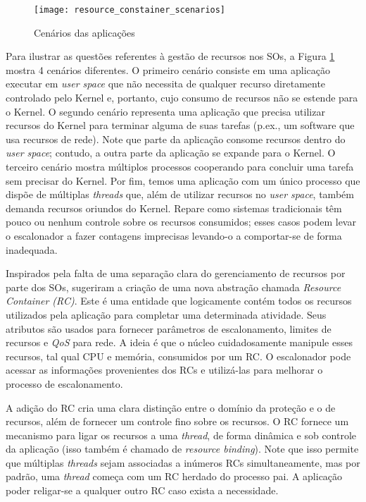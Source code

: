 \begin{figure}[!h]
  \centering
  \texttt{[image: resource\_constainer\_scenarios]} 
  \caption{Cenários das aplicações}
  \label{fig:resource_constainer_scenarios}
\end{figure}

Para ilustrar as questões referentes à gestão de recursos nos SOs, a Figura
\ref{fig:resource_constainer_scenarios} mostra 4 cenários diferentes. O
primeiro cenário consiste em uma aplicação executar em \textit{user space} que
não necessita de qualquer recurso diretamente controlado pelo Kernel e,
portanto, cujo consumo de recursos não se estende para o Kernel. O segundo
cenário representa uma aplicação que precisa utilizar recursos do Kernel para
terminar alguma de suas tarefas (p.ex., um software que usa recursos de rede).
Note que parte da aplicação consome recursos dentro do \textit{user space};
contudo, a outra parte da aplicação se expande para o Kernel. O terceiro cenário
mostra múltiplos processos cooperando para concluir uma tarefa sem precisar
do Kernel. Por fim, temos uma aplicação com um único processo que dispõe de
múltiplas \emph{threads} que, além de utilizar recursos no \textit{user space}, também
demanda recursos oriundos do Kernel. Repare como sistemas tradicionais têm
pouco ou nenhum controle sobre os recursos consumidos; esses casos
podem levar o escalonador a fazer contagens imprecisas levando-o a
comportar-se de forma inadequada.

Inspirados pela falta de uma separação clara do gerenciamento de recursos por
parte dos SOs, \citet{resourcecontainers} sugeriram a criação de uma nova
abstração chamada \emph{Resource Container (RC)}. Este é uma entidade que
logicamente contém todos os recursos utilizados pela aplicação para completar
uma determinada atividade. Seus atributos são usados para fornecer parâmetros
de escalonamento, limites de recursos e \emph{QoS} para rede. A ideia é que o
núcleo cuidadosamente manipule esses recursos, tal qual CPU e memória, consumidos
por um RC. O escalonador pode acessar as informações provenientes dos RCs e
utilizá-las para melhorar o processo de escalonamento.

A adição do RC cria uma clara distinção entre o domínio da proteção e o de
recursos, além de fornecer um controle fino sobre os recursos. O RC fornece um
mecanismo para ligar os recursos a uma \emph{thread}, de forma
dinâmica e sob controle da aplicação (isso também é chamado de \emph{resource
binding}). Note que isso permite que múltiplas \emph{threads} sejam associadas a
inúmeros RCs simultaneamente, mas por padrão, uma \emph{thread} começa com um RC
herdado do processo pai. A aplicação poder religar-se a qualquer outro RC
caso exista a necessidade.

